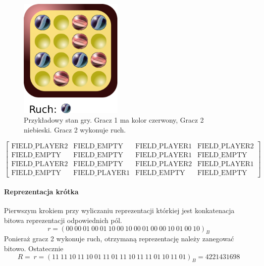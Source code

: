 \documentclass{scrartcl}
\begin{document}
\begin{figure}[h!]
  \centering
  \includegraphics[width=5cm]{data/example_board.pdf}
  \caption{Przykładowy stan gry. Gracz 1 ma kolor czerwony, Gracz 2
niebieski. Gracz 2 wykonuje ruch.}
  \label{fig:example_state}
\end{figure}

\[ \begin{bmatrix}
\text{FIELD\_PLAYER2} & \text{FIELD\_EMPTY} & 
\text{FIELD\_PLAYER1} & \text{FIELD\_PLAYER2} \\ 
\text{FIELD\_EMPTY} & \text{FIELD\_EMPTY} & 
\text{FIELD\_PLAYER1} & \text{FIELD\_EMPTY} \\ 
\text{FIELD\_PLAYER2} & \text{FIELD\_EMPTY} & 
\text{FIELD\_PLAYER2} & \text{FIELD\_PLAYER1} \\ 
\text{FIELD\_EMPTY} & \text{FIELD\_PLAYER1} & 
\text{FIELD\_EMPTY} & \text{FIELD\_EMPTY}
\end{bmatrix}
\]

\paragraph{Reprezentacja krótka} Pierwszym krokiem przy wyliczaniu reprezentacji którkiej jest 
konkatenacja bitowa reprezentacji odpowiednich pól.
\[r = (00\ 00\ 01\ 00\ 01\ 10\ 00\ 10\ 00\ 01\ 00\ 00\ 10\ 01\ 00\ 10
)_B \]
Ponieraż gracz 2 wykonuje ruch, otrzymaną reprezentację należy
zanegować bitowo. Ostatecznie
\[R = ~r = (11\ 11\ 10\ 11\ 10\ 01\ 11\ 01\ 11\ 10\ 11\ 11\ 01\ 10\ 11\ 01)_B
= 4221431698 \]
\end{document}
